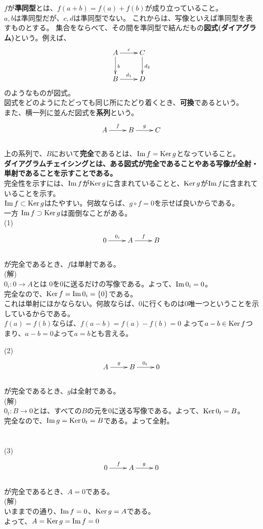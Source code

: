$f$が\textbf{準同型}とは、$f(a+b) = f(a) + f(b)$が成り立っていること。\\
$a,b$は準同型だが、$c,d$は準同型でない。
これからは、写像といえば準同型を表すものとする。
集合をならべて、その間を準同型で結んだもの\textbf{図式(ダイアグラム)}という。例えば、
\[
\xymatrix
{
A \ar[d]^{b} \ar[r]^{c} 	& C \ar[d]^{d_2}\\
B \ar[r]^{d_1}			& D
}
\]
のようなものが図式。\\
図式をどのようにたどっても同じ所にたどり着くとき、\textbf{可換}であるという。\\
また、横一列に並んだ図式を\textbf{系列}という。\\
\[
\xymatrix{
A \ar[r]^{f} & B \ar[r]^{g} &C  \\
}
\]\\
上の系列で、$B$において\textbf{完全}であるとは、$\mathop{\mathrm{Im}}\nolimits f = \mathop{\mathrm{Ker}}\nolimits g$となっていること。\\
\textbf{ダイアグラムチェイシングとは、ある図式が完全であることやある写像が全射・単射であることを示すことである。}\\
完全性を示すには、$\mathop{\mathrm{Im}}\nolimits f$が$\mathop{\mathrm{Ker}}\nolimits g$に含まれていることと、$\mathop{\mathrm{Ker}}\nolimits g$が$\mathop{\mathrm{Im}}\nolimits f$に含まれていることを示す。\\
$\mathop{\mathrm{Im}}\nolimits f \subset \mathop{\mathrm{Ker}}\nolimits g$はたやすい。何故ならば、$ g \circ f = 0$を示せば良いからである。\\
一方 $\mathop{\mathrm{Im}}\nolimits f \supset \mathop{\mathrm{Ker}}\nolimits g$は面倒なことがある。\\
(1) \[
\xymatrix{
0 \ar[r]^{0_i} & A \ar[r]^{f} &B  \\
}
\]\\
が完全であるとき、$f$は単射である。\\
(解)\\
$ 0_i \colon 0 \rightarrow A $とは $0$を$0$に送るだけの写像である。よって、$\mathop{\mathrm{Im}}\nolimits 0_i = 0$。\\
完全なので、$ \mathop{\mathrm{Ker}}\nolimits f = \mathop{\mathrm{Im}}\nolimits 0_i = \{0\} $である。\\
これは単射にほかならない。何故ならば、$0$に行くものは$0$唯一つということを示しているからである。\\
$f(a)=f(b)$ならば、$f(a-b) = f(a)-f(b) = 0$ よって$ a-b \in \mathop{\mathrm{Ker}}\nolimits f$つまり、$a-b=0$よって$a=b$とも言える。

(2) \[
\xymatrix{
A \ar[r]^{g} & B \ar[r]^{0_t} &0  \\
}
\]\\
が完全であるとき、$g$は全射である。\\
(解)\\
$ 0_t \colon B \rightarrow 0 $とは、すべての$B$の元を$0$に送る写像である。よって、$\mathop{\mathrm{Ker}}\nolimits 0_t = B$。\\
完全なので、$ \mathop{\mathrm{Im}}\nolimits g = \mathop{\mathrm{Ker}}\nolimits 0_t = B $である。よって全射。\\
   　　　\\
　　\\
(3) \[
\xymatrix{
0 \ar[r]^{f} & A \ar[r]^{g} &0  \\
}
\]\\
が完全であるとき、$A=0$である。\\
(解)\\
いままでの通り、$\mathop{\mathrm{Im}}\nolimits f = 0$、$\mathop{\mathrm{Ker}}\nolimits g = A$である。\\
よって、$A = \mathop{\mathrm{Ker}}\nolimits g = \mathop{\mathrm{Im}}\nolimits f = 0$

